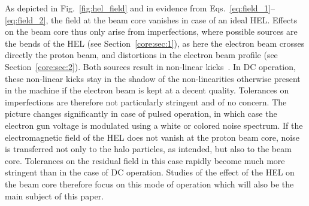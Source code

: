 \documentclass[%
 reprint,
 amsmath,amssymb,
 aps,
prstab,
]{revtex4-1}
\begin{document}
As depicted in Fig.~\ref{fig:hel_field} and in evidence from Eqs.~\ref{eq:field_1}--\ref{eq:field_2}, the field at the beam core vanishes in case of an ideal HEL. Effects on the beam core thus only arise from imperfections, where possible sources are the bends of the HEL (see Section~\ref{core:sec:1}), as here the electron beam crosses directly the proton beam, and distortions in the electron beam profile (see Section~\ref{core:sec:2}). Both sources result in non-linear kicks~\cite{hel_bends_stancari,hel_model_polynomial_morozov}. In DC operation, these non-linear kicks stay in the shadow of the non-linearities otherwise present in the machine if the electron beam is kept at a decent quality. Tolerances on imperfections are therefore not particularly stringent and of no concern. The picture changes significantly in case of pulsed operation, in which case the electron gun voltage is modulated using a white or colored noise spectrum. If the electromagnetic field of the HEL does not vanish at the proton beam core, noise is transferred not only to the halo particles, as intended, but also to the beam core. Tolerances on the residual field in this case rapidly become much more stringent than in the case of DC operation. Studies of the effect of the HEL on the beam core therefore focus on this mode of operation which will also be the main subject of this paper.


\end{document}
